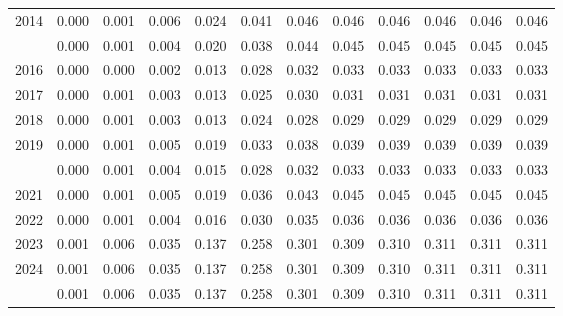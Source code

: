 \documentclass[
]{article}
\begin{document}
\begin{longtable}[t]{lrrrrrrrrrrr}
2014 & 0.000 & 0.001 & 0.006 & 0.024 & 0.041 & 0.046 & 0.046 & 0.046 & 0.046 & 0.046 & 0.046\\
\addlinespace
2015 & 0.000 & 0.001 & 0.004 & 0.020 & 0.038 & 0.044 & 0.045 & 0.045 & 0.045 & 0.045 & 0.045\\
2016 & 0.000 & 0.000 & 0.002 & 0.013 & 0.028 & 0.032 & 0.033 & 0.033 & 0.033 & 0.033 & 0.033\\
2017 & 0.000 & 0.001 & 0.003 & 0.013 & 0.025 & 0.030 & 0.031 & 0.031 & 0.031 & 0.031 & 0.031\\
2018 & 0.000 & 0.001 & 0.003 & 0.013 & 0.024 & 0.028 & 0.029 & 0.029 & 0.029 & 0.029 & 0.029\\
2019 & 0.000 & 0.001 & 0.005 & 0.019 & 0.033 & 0.038 & 0.039 & 0.039 & 0.039 & 0.039 & 0.039\\
\addlinespace
2020 & 0.000 & 0.001 & 0.004 & 0.015 & 0.028 & 0.032 & 0.033 & 0.033 & 0.033 & 0.033 & 0.033\\
2021 & 0.000 & 0.001 & 0.005 & 0.019 & 0.036 & 0.043 & 0.045 & 0.045 & 0.045 & 0.045 & 0.045\\
2022 & 0.000 & 0.001 & 0.004 & 0.016 & 0.030 & 0.035 & 0.036 & 0.036 & 0.036 & 0.036 & 0.036\\
2023 & 0.001 & 0.006 & 0.035 & 0.137 & 0.258 & 0.301 & 0.309 & 0.310 & 0.311 & 0.311 & 0.311\\
2024 & 0.001 & 0.006 & 0.035 & 0.137 & 0.258 & 0.301 & 0.309 & 0.310 & 0.311 & 0.311 & 0.311\\
\addlinespace
2025 & 0.001 & 0.006 & 0.035 & 0.137 & 0.258 & 0.301 & 0.309 & 0.310 & 0.311 & 0.311 & 0.311\\*
\end{longtable}
\end{document}
